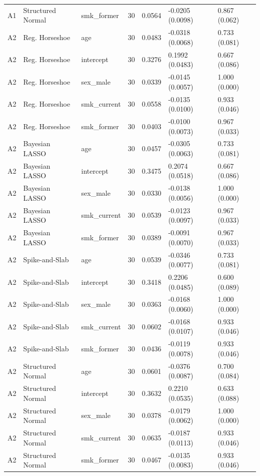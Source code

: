 \begin{tabular}{lllrlll}
  A1 & Structured Normal & smk\_former &  30 & 0.0564 & -0.0205 (0.0098) & 0.867 (0.062) \\ 
  A2 & Reg. Horseshoe & age &  30 & 0.0483 & -0.0318 (0.0068) & 0.733 (0.081) \\ 
  A2 & Reg. Horseshoe & intercept &  30 & 0.3276 & 0.1992 (0.0483) & 0.667 (0.086) \\ 
  A2 & Reg. Horseshoe & sex\_male &  30 & 0.0339 & -0.0145 (0.0057) & 1.000 (0.000) \\ 
  A2 & Reg. Horseshoe & smk\_current &  30 & 0.0558 & -0.0135 (0.0100) & 0.933 (0.046) \\ 
  A2 & Reg. Horseshoe & smk\_former &  30 & 0.0403 & -0.0100 (0.0073) & 0.967 (0.033) \\ 
  A2 & Bayesian LASSO & age &  30 & 0.0457 & -0.0305 (0.0063) & 0.733 (0.081) \\ 
  A2 & Bayesian LASSO & intercept &  30 & 0.3475 & 0.2074 (0.0518) & 0.667 (0.086) \\ 
  A2 & Bayesian LASSO & sex\_male &  30 & 0.0330 & -0.0138 (0.0056) & 1.000 (0.000) \\ 
  A2 & Bayesian LASSO & smk\_current &  30 & 0.0539 & -0.0123 (0.0097) & 0.967 (0.033) \\ 
  A2 & Bayesian LASSO & smk\_former &  30 & 0.0389 & -0.0091 (0.0070) & 0.967 (0.033) \\ 
  A2 & Spike-and-Slab & age &  30 & 0.0539 & -0.0346 (0.0077) & 0.733 (0.081) \\ 
  A2 & Spike-and-Slab & intercept &  30 & 0.3418 & 0.2206 (0.0485) & 0.600 (0.089) \\ 
  A2 & Spike-and-Slab & sex\_male &  30 & 0.0363 & -0.0168 (0.0060) & 1.000 (0.000) \\ 
  A2 & Spike-and-Slab & smk\_current &  30 & 0.0602 & -0.0168 (0.0107) & 0.933 (0.046) \\ 
  A2 & Spike-and-Slab & smk\_former &  30 & 0.0436 & -0.0119 (0.0078) & 0.933 (0.046) \\ 
  A2 & Structured Normal & age &  30 & 0.0601 & -0.0376 (0.0087) & 0.700 (0.084) \\ 
  A2 & Structured Normal & intercept &  30 & 0.3632 & 0.2210 (0.0535) & 0.633 (0.088) \\ 
  A2 & Structured Normal & sex\_male &  30 & 0.0378 & -0.0179 (0.0062) & 1.000 (0.000) \\ 
  A2 & Structured Normal & smk\_current &  30 & 0.0635 & -0.0187 (0.0113) & 0.933 (0.046) \\ 
  A2 & Structured Normal & smk\_former &  30 & 0.0467 & -0.0135 (0.0083) & 0.933 (0.046) \\ 

\end{tabular}
